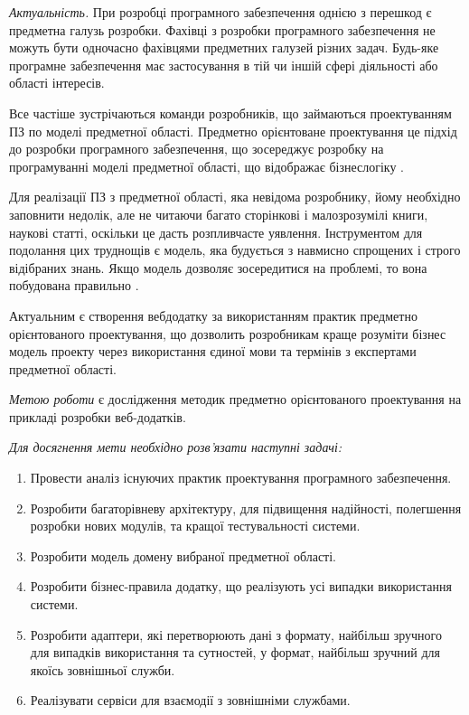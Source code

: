 
\emph{Актуальність.} При розробці програмного забезпечення однією з перешкод
є предметна галузь розробки. Фахівці з розробки програмного забезпечення
не можуть бути одночасно фахівцями предметних галузей різних задач.
Будь-яке програмне забезпечення має застосування в
тій чи іншій сфері діяльності або області інтересів.

Все частіше зустрічаються команди розробників, що займаються проектуванням
ПЗ по моделі предметної області. Предметно орієнтоване проектування це
підхід до розробки програмного забезпечення, що зосереджує розробку
на програмуванні моделі предметної області, що відображає бізнес­логіку 
\cite{ddd-evans, ddd-vernon, agile-book, scrum-guide, os-development, scrum-book}.

Для реалізації ПЗ з предметної області, яка невідома розробнику,
йому необхідно заповнити недолік, але не читаючи багато сторінкові
і малозрозумілі книги, наукові статті, оскільки це дасть розпливчасте уявлення.
Інструментом для подолання цих труднощів є модель,
яка будується з навмисно спрощених і строго відібраних знань.
Якщо модель дозволяє зосередитися на проблемі, то вона побудована правильно 
\cite{ddd-evans, ddd-vernon, agile-book, os-development}.

Актуальним є створення веб­додатку за використанням практик предметно орієнтованого проектування,
що дозволить розробникам краще розуміти бізнес модель проекту через використання
єдиної мови та термінів з експертами предметної області.

\emph{Метою роботи} є дослідження методик предметно орієнтованого проектування
на прикладі розробки веб-додатків.

\textit{Для досягнення мети необхідно розв'язати наступні задачі:}

\begin{enumerate}
  \item Провести аналіз існуючих практик проектування програмного забезпечення.
	\item Розробити багаторівневу архітектуру, для підвищення надійності,
		полегшення розробки нових модулів, та кращої тестувальності системи.
	\item Розробити модель домену вибраної предметної області.
	\item Розробити бізнес-правила додатку, що реалізують усі випадки
		використання системи.
	\item Розробити адаптери, які перетворюють дані з формату,
		найбільш зручного для випадків використання та сутностей,
		у формат, найбільш зручний для якоїсь зовнішньої служби.
	\item Реалізувати сервіси для взаємодії з зовнішніми службами.
\end{enumerate}

